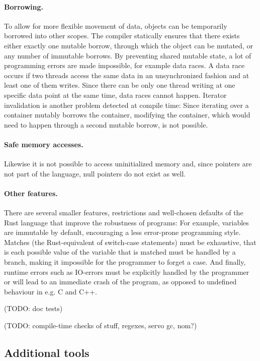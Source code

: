 \documentclass{scrartcl}
\newcommand{\todo}[1] {{\color{red}(TODO: #1)}}
\begin{document}
\paragraph{Borrowing.} To allow for more flexible movement of data, objects can be temporarily borrowed into other scopes. The compiler statically ensures that there exists either exactly one mutable borrow, through which the object can be mutated, or any number of immutable borrows. By preventing shared mutable state, a lot of programming errors are made impossible, for example data races. A data race occurs if two threads access the same data in an unsynchronized fashion and at least one of them writes. Since there can be only one thread writing at one specific data point at the same time, data races cannot happen. Iterator invalidation is another problem detected at compile time: Since iterating over a container mutably borrows the container, modifying the container, which would need to happen through a second mutable borrow, is not possible.

\paragraph{Safe memory accesses.} Likewise it is not possible to access uninitialized memory and, since pointers are not part of the language, null pointers do not exist as well.

\paragraph{Other features.} There are several smaller features, restrictions and well-chosen defaults of the Rust language that improve the robustness of programs: For example, variables are immutable by default, encouraging a less error-prone programming style. Matches (the Rust-equivalent of switch-case statements) must be exhaustive, that is each possible value of the variable that is matched must be handled by a branch, making it impossible for the programmer to forget a case. And finally, runtime errors such as IO-errors must be explicitly handled by the programmer or will lead to an immediate crash of the program, as opposed to undefined behaviour in e.g. C and C++.


\todo{doc tests}

\todo{compile-time checks of stuff, regexes, servo gc, nom?}


\subsection{Additional tools}
\end{document}

